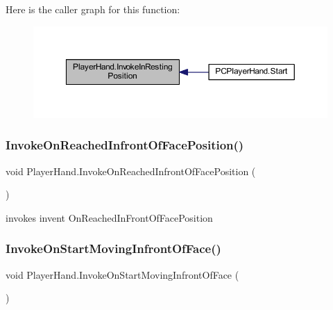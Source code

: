 Here is the caller graph for this function\+:\nopagebreak
\begin{figure}[H]
\begin{center}
\leavevmode
\includegraphics[width=350pt]{class_player_hand_a886f7afd66af7f0dc59696953aaed4b4_icgraph}
\end{center}
\end{figure}
\mbox{\label{class_player_hand_aa2accfa8b13a70b78b1cd4029cdaaa1e}} 
\subsubsection{\texorpdfstring{Invoke\+On\+Reached\+Infront\+Of\+Face\+Position()}{InvokeOnReachedInfrontOfFacePosition()}}
{\footnotesize\ttfamily void Player\+Hand.\+Invoke\+On\+Reached\+Infront\+Of\+Face\+Position (\begin{DoxyParamCaption}{ }\end{DoxyParamCaption})\hspace{0.3cm}{\ttfamily [protected]}}



invokes invent On\+Reached\+In\+Front\+Of\+Face\+Position 

\mbox{\label{class_player_hand_a1f8cc0ae3bc7e9d3c4d21943eb09852e}} 
\subsubsection{\texorpdfstring{Invoke\+On\+Start\+Moving\+Infront\+Of\+Face()}{InvokeOnStartMovingInfrontOfFace()}}
{\footnotesize\ttfamily void Player\+Hand.\+Invoke\+On\+Start\+Moving\+Infront\+Of\+Face (\begin{DoxyParamCaption}{ }\end{DoxyParamCaption})\hspace{0.3cm}{\ttfamily [protected]}}




